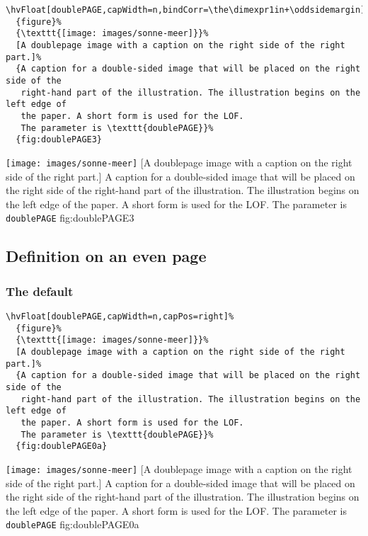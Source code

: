 \documentclass[twoside]{scrartcl}
\makeatletter
\let\hvBlindtext\Blindtext
\def\Blindtext{\par\color{black!40}\hvBlindtext\par\normalcolor}
\def\hvblindtext{\textcolor{black!40}{\blindtext@text}}
\makeatother
\begin{document}
\begin{lstlisting}
\hvFloat[doublePAGE,capWidth=n,bindCorr=\the\dimexpr1in+\oddsidemargin]%
  {figure}%
  {\texttt{[image: images/sonne-meer]}}%
  [A doublepage image with a caption on the right side of the right part.]%
  {A caption for a double-sided image that will be placed on the right side of the
   right-hand part of the illustration. The illustration begins on the left edge of 
   the paper. A short form is used for the LOF. 
   The parameter is \texttt{doublePAGE}}%
  {fig:doublePAGE3}
\end{lstlisting}

%
  {\texttt{[image: images/sonne-meer]}}%
  [A doublepage image with a caption on the right side of the right part.]%
  {A caption for a double-sided image that will be placed on the right side of the
   right-hand part of the illustration. The illustration begins on the left edge of 
   the paper. A short form is used for the LOF. 
   The parameter is \texttt{doublePAGE}}%
  {fig:doublePAGE3}


\hvblindtext

\Blindtext

\hvblindtext


\subsection{Definition on an even page}


\subsubsection{The default}

\begin{lstlisting}
\hvFloat[doublePAGE,capWidth=n,capPos=right]%
  {figure}%
  {\texttt{[image: images/sonne-meer]}}%
  [A doublepage image with a caption on the right side of the right part.]%
  {A caption for a double-sided image that will be placed on the right side of the
   right-hand part of the illustration. The illustration begins on the left edge of 
   the paper. A short form is used for the LOF. 
   The parameter is \texttt{doublePAGE}}%
  {fig:doublePAGE0a}
\end{lstlisting}


%
  {\texttt{[image: images/sonne-meer]}}%
  [A doublepage image with a caption on the right side of the right part.]%
  {A caption for a double-sided image that will be placed on the right side of the
   right-hand part of the illustration. The illustration begins on the left edge of 
   the paper. A short form is used for the LOF. 
   The parameter is \texttt{doublePAGE}}%
  {fig:doublePAGE0a}
\end{document}
